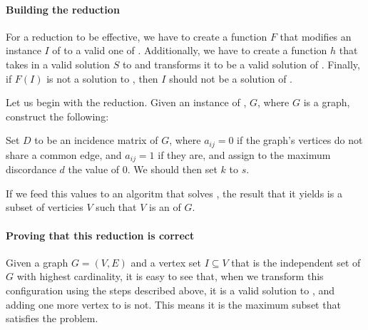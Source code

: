 \paragraph{Building the reduction}
For a reduction to be effective, we have to create a function $F$ that modifies an instance $I$ of \is{} to a valid one of \exc{}. Additionally, we have to create a function $h$ that takes in a valid solution $S$ to \exc{} and transforms it to be a valid solution of \is{}. Finally, if $F(I)$ is not a solution to \exc{}, then $I$ should not be a solution of \is{}.

Let us begin with the reduction. Given an instance of \is{}, $G$, where $G$ is a graph, construct the following:

Set $D$ to be an incidence matrix of $G$, where $a_{ij}=0$ if the graph's vertices do not share a common edge, and $a_{ij}=1$ if they are, and assign to the maximum discordance $d$ the value of 0. We should then set $k$ to $s$.

If we feed this values to an algoritm that solves \exc{}, the result that it yields is a subset of verticies $V$ such that $V$ is an \is{} of $G$.

\paragraph{Proving that this reduction is correct}
Given a graph $G = (V,E)$ and a vertex set $I \subseteq V$ that is the independent set of $G$ with highest cardinality, it is easy to see that, when we transform this configuration using the steps described above, it is a valid solution to \exc{}, and adding one more vertex to is not. This means it is the maximum subset that satisfies the problem.
